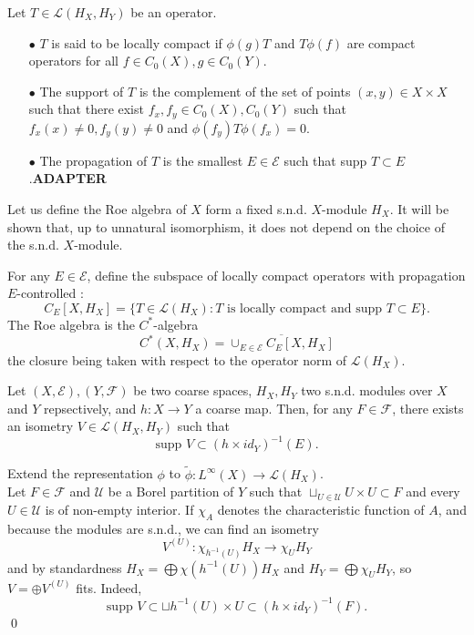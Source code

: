 \begin{definition}
Let $T\in \mathcal L(H_X, H_Y)$ be an operator.
\begin{itemize}
\item[$\bullet$] $T$ is said to be locally compact if $\phi(g)T$ and $T\phi(f)$ are compact operators for all $f\in C_0(X),g\in C_0(Y)$.
\item[$\bullet$] The support of $T$ is the complement of the set of points $(x,y)\in X\times X$ such that there exist $f_x,f_y\in C_0(X),C_0(Y)$ such that $f_x(x)\neq 0,f_{y}(y)\neq 0$ and $\phi(f_{y}) T \phi(f_x)=0$.
\item[$\bullet$] The propagation of $T$ is the smallest $E\in \mathcal E$ such that supp $T \subset E$.\textbf{ADAPTER}
\end{itemize}
\end{definition}

Let us define the Roe algebra of $X$ form a fixed s.n.d. $X$-module $H_X$. It will be shown that, up to unnatural isomorphism, it does not depend on the choice of the s.n.d. $X$-module.\\

\begin{definition}
For any $E\in \mathcal E$, define the subspace of locally compact operators with propagation $E$-controlled :
\[C_E[X,H_X] = \{T\in\mathcal L(H_X) : T \text{ is locally compact and supp }T\subset E\}.\]
The Roe algebra is the $C^*$-algebra 
\[C^*(X,H_X) = \overline{\cup_{E\in\mathcal E} C_E[X,H_X]}\]
the closure being taken with respect to the operator norm of $\mathcal L(H_X)$.
\end{definition}

\begin{prop}
Let $(X,\mathcal E),(Y,\mathcal F)$ be two coarse spaces, $H_X,H_Y$ two s.n.d. modules over $X$ and $Y$ repsectively, and $h :X\rightarrow Y$ a coarse map. Then, for any $F\in \mathcal F$, there exists an isometry $V\in \mathcal L(H_X,H_Y)$ such that
\[\text{supp }V \subset (h\times id_Y)^{-1}(E).\]
\end{prop}

\begin{dem}
Extend the representation $\phi$ to $\tilde \phi : L^\infty (X)\rightarrow \mathcal L(H_X)$. \\

Let $F\in \mathcal F$ and $\mathcal U$ be a Borel partition of $Y$ such that $\sqcup_{U\in \mathcal U} U\times U \subset F$ and every $U\in \mathcal U$ is of non-empty interior. If $\chi_A$ denotes the characteristic function of $A$, and because the modules are s.n.d., we can find an isometry \[V^{(U)} :\chi_{h^{-1}(U)}H_X \rightarrow \chi_U H_Y\] 
and by standardness $H_X =\bigoplus \chi(h^{-1}(U)) H_X$ and $H_Y =\bigoplus \chi_U H_Y$, so $V = \oplus V^{(U)}$ fits. Indeed, 
\[\text{supp }V\subset \sqcup h^{-1}(U)\times U \subset (h\times id_Y)^{-1}(F).\] 
\qed
\end{dem}

